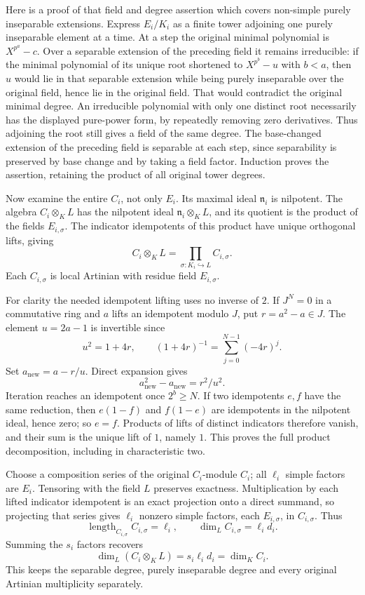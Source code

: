 Here is a proof of that field and degree assertion which covers non-simple purely inseparable extensions. Express \(E_i/K_i\) as a finite tower adjoining one purely inseparable element at a time. At a step the original minimal polynomial is \(X^{p^a}-c\). Over a separable extension of the preceding field it remains irreducible: if the minimal polynomial of its unique root shortened to \(X^{p^b}-u\) with \(b<a\), then \(u\) would lie in that separable extension while being purely inseparable over the original field, hence lie in the original field. That would contradict the original minimal degree. An irreducible polynomial with only one distinct root necessarily has the displayed pure-power form, by repeatedly removing zero derivatives. Thus adjoining the root still gives a field of the same degree. The base-changed extension of the preceding field is separable at each step, since separability is preserved by base change and by taking a field factor. Induction proves the assertion, retaining the product of all original tower degrees.

Now examine the entire \(C_i\), not only \(E_i\). Its maximal ideal \(\mathfrak n_i\) is nilpotent. The algebra \(C_i\otimes_K L\) has the nilpotent ideal \(\mathfrak n_i\otimes_K L\), and its quotient is the product of the fields \(E_{i,\sigma}\). The indicator idempotents of this product have unique orthogonal lifts, giving \[
C_i\otimes_K L=
\prod_{\sigma:K_i\hookrightarrow L} C_{i,\sigma}.
\] Each \(C_{i,\sigma}\) is local Artinian with residue field \(E_{i,\sigma}\).

For clarity the needed idempotent lifting uses no inverse of \(2\). If \(J^N=0\) in a commutative ring and \(a\) lifts an idempotent modulo \(J\), put \(r=a^2-a\in J\). The element \(u=2a-1\) is invertible since \[
u^2=1+4r,\qquad
(1+4r)^{-1}=\sum_{j=0}^{N-1}(-4r)^j.
\] Set \(a_{\mathrm{new}}=a-r/u\). Direct expansion gives \[
a_{\mathrm{new}}^2-a_{\mathrm{new}}=r^2/u^2.
\] Iteration reaches an idempotent once \(2^b\ge N\). If two idempotents \(e,f\) have the same reduction, then \(e(1-f)\) and \(f(1-e)\) are idempotents in the nilpotent ideal, hence zero; so \(e=f\). Products of lifts of distinct indicators therefore vanish, and their sum is the unique lift of \(1\), namely \(1\). This proves the full product decomposition, including in characteristic two.

Choose a composition series of the original \(C_i\)-module \(C_i\); all \(\ell_i\) simple factors are \(E_i\). Tensoring with the field \(L\) preserves exactness. Multiplication by each lifted indicator idempotent is an exact projection onto a direct summand, so projecting that series gives \(\ell_i\) nonzero simple factors, each \(E_{i,\sigma}\), in \(C_{i,\sigma}\). Thus \[
\operatorname{length}_{C_{i,\sigma}}C_{i,\sigma}=\ell_i,
\qquad
\dim_L C_{i,\sigma}=\ell_i d_i.
\] Summing the \(s_i\) factors recovers \[
\dim_L(C_i\otimes_K L)
=s_i\ell_i d_i=\dim_K C_i.
\] This keeps the separable degree, purely inseparable degree and every original Artinian multiplicity separately.

